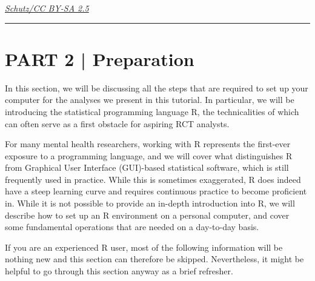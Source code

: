 \vspace{-20pt}
\begin{flushright}
\footnotesize \href{https://commons.wikimedia.org/wiki/File:Fisher-stainedglass-gonville-caius.jpg}{\emph{Schutz/CC BY-SA 2.5}}
\end{flushright}
\vspace{-20pt}

\par\noindent\rule{\textwidth}{0.4pt}

\newpage

\tableofcontents
 
\newpage


\section{{\textsf{\textcolor{sBlue}{\small PART 2 |}}} Preparation}

In this section, we will be discussing all the steps that are required to set up your computer for the analyses we present in this tutorial. In particular, we will be introducing the statistical programming language \textsf{R}, the technicalities of which can often serve as a first obstacle for aspiring RCT analysts.

For many mental health researchers, working with \textsf{R} represents the first-ever exposure to a programming language, and we will cover what distinguishes \textsf{R} from Graphical User Interface (GUI)-based statistical software, which is still frequently used in practice. While this is sometimes exaggerated, \textsf{R} does indeed have a steep learning curve and requires continuous practice to become proficient in. While it is not possible to provide an in-depth introduction into \textsf{R}, we will describe how to set up an \textsf{R} environment on a personal computer, and cover some fundamental operations that are needed on a day-to-day basis.

If you are an experienced \textsf{R} user, most of the following information will be nothing new and this section can therefore be skipped. Nevertheless, it might be helpful to go through this section anyway as a brief refresher.

